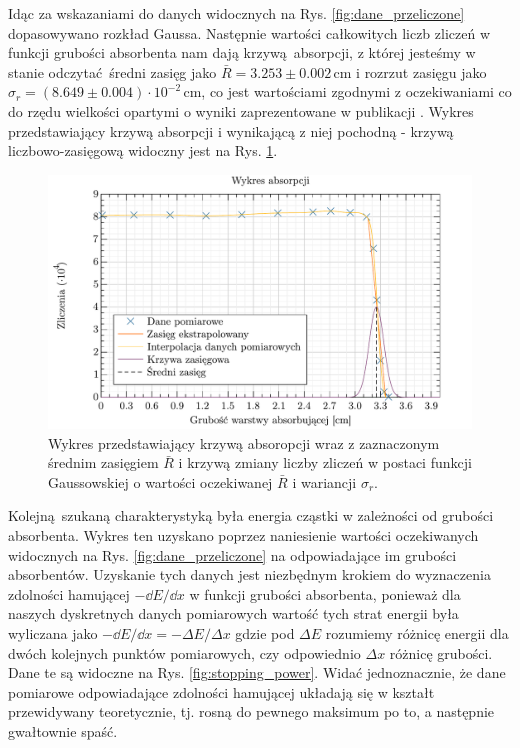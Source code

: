 \documentclass[pra,
superscriptaddress,
amssymb,amsmath,amsmath,showpacs,reprint,twocolumn]{revtex4-1}
\begin{document}
Idąc za wskazaniami \cite{publikacja} do danych widocznych na  Rys. \ref{fig:dane_przeliczone} dopasowywano rozkład Gaussa. Następnie wartości całkowitych liczb zliczeń w funkcji grubości absorbenta nam dają krzywą absorpcji, z której jesteśmy w stanie odczytać średni zasięg jako $\bar{R} = 3.253 \pm 0.002$\,cm i rozrzut zasięgu jako $\sigma_r = (8.649 \pm 0.004)\cdot 10^{-2}$\,cm, co jest wartościami zgodnymi z oczekiwaniami co do rzędu wielkości opartymi o wyniki zaprezentowane w publikacji \cite{publikacja}. Wykres przedstawiający krzywą absorpcji i wynikającą z niej pochodną - krzywą liczbowo-zasięgową widoczny jest na Rys. \ref{fig:absorpcja}.

\begin{figure}[h!]
    \centering
    \includegraphics[keepaspectratio, width=0.8\linewidth]{absorpcja.pdf}
    \caption{Wykres przedstawiający krzywą absoropcji wraz z zaznaczonym średnim zasięgiem $\bar{R}$ i krzywą zmiany liczby zliczeń w postaci funkcji Gaussowskiej o wartości oczekiwanej $\bar{R}$ i wariancji $\sigma_r$.}
    \label{fig:absorpcja}
\end{figure}

\newpage

Kolejną szukaną charakterystyką była energia cząstki w zależności od grubości absorbenta. Wykres ten uzyskano poprzez naniesienie wartości oczekiwanych widocznych na Rys. \ref{fig:dane_przeliczone} na odpowiadające im grubości absorbentów. Uzyskanie tych danych jest niezbędnym krokiem do wyznaczenia zdolności hamującej $-\dd{E}/\dd{x}$ w funkcji grubości absorbenta, ponieważ dla naszych dyskretnych danych pomiarowych wartość tych strat energii była wyliczana jako $-\dd{E}/\dd{x} = - \Delta E / \Delta x$ gdzie pod $\Delta E$ rozumiemy różnicę energii dla dwóch kolejnych punktów pomiarowych, czy odpowiednio $\Delta x$ różnicę grubości. Dane te są widoczne na Rys. \ref{fig:stopping_power}. Widać jednoznacznie, że dane pomiarowe odpowiadające zdolności hamującej układają się w kształt przewidywany teoretycznie, tj. rosną do pewnego maksimum po to, a następnie gwałtownie spaść.
\end{document}
